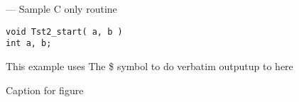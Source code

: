 \startmanpage
{}
--- Sample C only routine 
\startvb\begin{verbatim}
void Tst2_start( a, b )
int a, b;

\end{verbatim}
\endvb
This example uses
\linebreak   The \$ symbol to do verbatim output\linebreak   up to here
\par
\centerline{}\begin{center}\bf
\par
Caption for figure
\end{center}
\par
\par
\par
{}
\endmanpage

